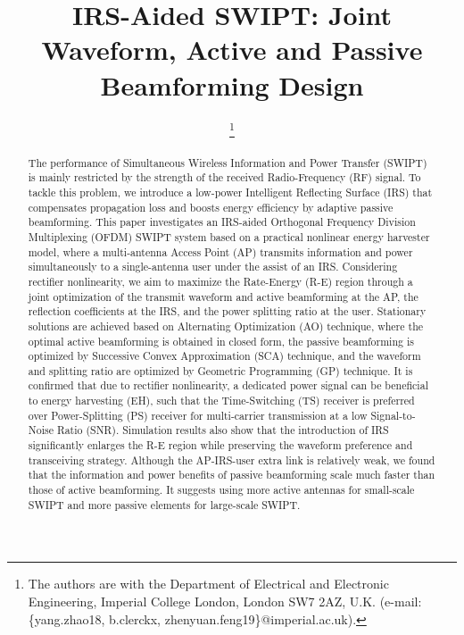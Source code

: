 \documentclass[journal]{IEEEtran}
\begin{document}
	\title{IRS-Aided SWIPT: Joint Waveform, Active and Passive Beamforming Design}
	\author{
		\thanks{
			The authors are with the Department of Electrical and Electronic Engineering, Imperial College London, London SW7 2AZ, U.K. (e-mail: \{yang.zhao18, b.clerckx, zhenyuan.feng19\}@imperial.ac.uk).
		}
	}
	\maketitle


	\begin{abstract}
		The performance of Simultaneous Wireless Information and Power Transfer (SWIPT) is mainly restricted by the strength of the received Radio-Frequency (RF) signal. To tackle this problem, we introduce a low-power Intelligent Reflecting Surface (IRS) that compensates propagation loss and boosts energy efficiency by adaptive passive beamforming. This paper investigates an IRS-aided Orthogonal Frequency Division Multiplexing (OFDM) SWIPT system based on a practical nonlinear energy harvester model, where a multi-antenna Access Point (AP) transmits information and power simultaneously to a single-antenna user under the assist of an IRS. Considering rectifier nonlinearity, we aim to maximize the Rate-Energy (R-E) region through a joint optimization of the transmit waveform and active beamforming at the AP, the reflection coefficients at the IRS, and the power splitting ratio at the user. Stationary solutions are achieved based on Alternating Optimization (AO) technique, where the optimal active beamforming is obtained in closed form, the passive beamforming is optimized by Successive Convex Approximation (SCA) technique, and the waveform and splitting ratio are optimized by Geometric Programming (GP) technique. It is confirmed that due to rectifier nonlinearity, a dedicated power signal can be beneficial to energy harvesting (EH), such that the Time-Switching (TS) receiver is preferred over Power-Splitting (PS) receiver for multi-carrier transmission at a low Signal-to-Noise Ratio (SNR). Simulation results also show that the introduction of IRS significantly enlarges the R-E region while preserving the waveform preference and transceiving strategy. Although the AP-IRS-user extra link is relatively weak, we found that the information and power benefits of passive beamforming scale much faster than those of active beamforming. It suggests using more active antennas for small-scale SWIPT and more passive elements for large-scale SWIPT.
	\end{abstract}
\end{document}
